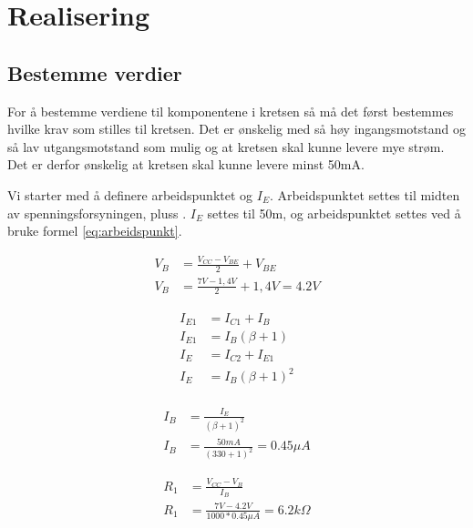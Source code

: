 \newpage
\section{Realisering}
\label{realiseringOgTest}

\subsection[short]{Bestemme verdier}
\label{bestemmeVerdier}

For å bestemme verdiene til komponentene i kretsen så må det først bestemmes hvilke krav som stilles til kretsen. Det er ønskelig med så høy ingangsmotstand og så lav utgangsmotstand som mulig og at kretsen skal kunne levere mye strøm. %
Det er derfor ønskelig at kretsen skal kunne levere minst 50mA.

Vi starter med å definere arbeidspunktet og $I_E$. Arbeidspunktet settes til midten av spenningsforsyningen, pluss . $I_E$ settes til 50m, og arbeidspunktet settes ved å bruke formel \ref{eq:arbeidspunkt}. 

\begin{equation}
\label{eq:arbeidspunkt}
\begin{split}
V_B &= \frac{V_{CC} - V_{BE}}{2} + V_{BE}\\
V_B &= \frac{7V - 1,4V}{2} + 1,4V = 4.2V
\end{split}
\end{equation}

\begin{equation}
\label{eq:IE}
\begin{split}
I_{E1} &= I_{C1} + I_{B}\\
I_{E1} &= I_{B}(\beta + 1)\\
I_{E} &= I_{C2} + I_{E1}\\
I_{E} &= I_{B}(\beta + 1)^2 \\
\end{split}
\end{equation}

\begin{equation}
\label{eq:IB}
\begin{split}
I_{B} &= \frac{I_{E}}{(\beta + 1)^2} \\
I_{B} &= \frac{50mA}{(330 + 1)^2} = 0.45\mu A
\end{split}
\end{equation}

\begin{equation}
\label{eq:R1}
\begin{split}
R_{1} &= \frac{V_{CC} - V_{B}}{I_{B}}\\
R_{1} &= \frac{7V - 4.2V}{1000*0.45\mu A} = 6.2k\Omega
\end{split}
\end{equation}

